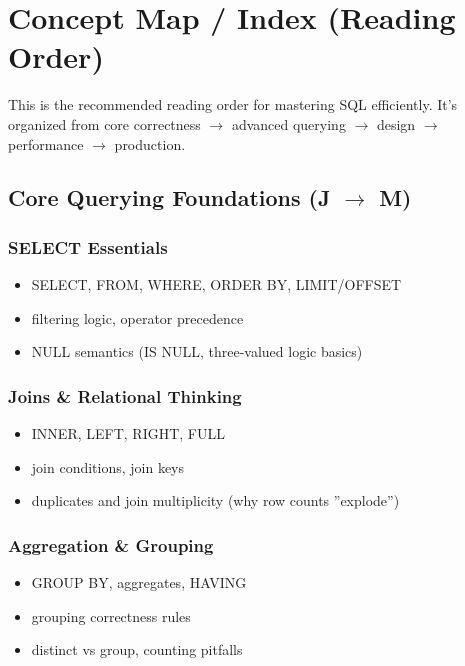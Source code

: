 \section{Concept Map / Index (Reading Order)}

This is the recommended reading order for mastering SQL efficiently. It's organized from 
core correctness $\rightarrow$ advanced querying $\rightarrow$ design $\rightarrow$ performance 
$\rightarrow$ production.

\subsection{Core Querying Foundations (J $\rightarrow$ M)}

\subsubsection{SELECT Essentials}
\begin{itemize}
    \item SELECT, FROM, WHERE, ORDER BY, LIMIT/OFFSET
    \item filtering logic, operator precedence
    \item NULL semantics (IS NULL, three-valued logic basics)
\end{itemize}

\subsubsection{Joins \& Relational Thinking}
\begin{itemize}
    \item INNER, LEFT, RIGHT, FULL
    \item join conditions, join keys
    \item duplicates and join multiplicity (why row counts ''explode'')
\end{itemize}

\subsubsection{Aggregation \& Grouping}
\begin{itemize}
    \item GROUP BY, aggregates, HAVING
    \item grouping correctness rules
    \item distinct vs group, counting pitfalls
\end{itemize}

